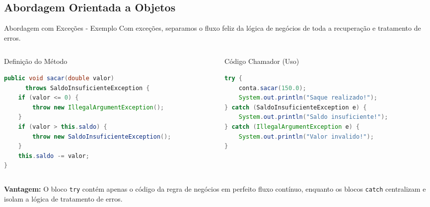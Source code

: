 \documentclass[9pt]{beamer}
\begin{document}
\subsection{Abordagem Orientada a Objetos}
\begin{frame}[fragile]{Abordagem com Exceções - Exemplo}
    Com exceções, separamos o fluxo feliz da lógica de negócios de toda a recuperação e tratamento de erros.
    
    \vspace{0.2cm}
    
    \begin{columns}[t]
        \begin{column}{0.48\textwidth}
            \begin{block}{Definição do Método}
                \begin{lstlisting}[language=Java,numbers=none]
public void sacar(double valor) 
      throws SaldoInsuficienteException {
    if (valor <= 0) {
        throw new IllegalArgumentException();
    }
    if (valor > this.saldo) {
        throw new SaldoInsuficienteException();
    }
    this.saldo -= valor;
}
\end{lstlisting}
            \end{block}
        \end{column}
        
        \begin{column}{0.48\textwidth}
            \begin{block}{Código Chamador (Uso)}
                \begin{lstlisting}[language=Java,numbers=none]
try {
    conta.sacar(150.0);
    System.out.println("Saque realizado!");
} catch (SaldoInsuficienteException e) {
    System.out.println("Saldo insuficiente!");
} catch (IllegalArgumentException e) {
    System.out.println("Valor invalido!");
}
\end{lstlisting}
            \end{block}
        \end{column}
    \end{columns}
    
    \vspace{0.15cm}
    \scriptsize
    \textbf{Vantagem:} O bloco \texttt{try} contém apenas o código da regra de negócios em perfeito fluxo contínuo, enquanto os blocos \texttt{catch} centralizam e isolam a lógica de tratamento de erros.
\end{frame}
\end{document}
